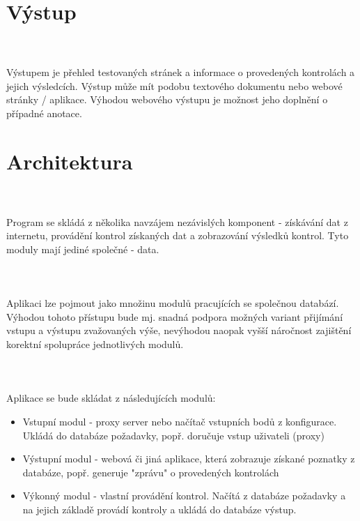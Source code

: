 \documentclass[10pt]{article}
\begin{document}
\section{V\'ystup}
\paragraph{~}V\'ystupem je p\v{r}ehled testovan\'ych str\'anek a informace o proveden\'ych kontrol\'ach a jejich v\'ysledc\'ich. V\'ystup m\r{u}\v{z}e m\'it podobu textov\'eho dokumentu nebo webov\'e str\'anky / aplikace. V\'yhodou webov\'eho v\'ystupu je mo\v{z}nost jeho dopln\v{e}n\'i o p\v{r}\'ipadn\'e anotace.

\section{Architektura}
\paragraph{~}Program se skl\'ad\'a z n\v{e}kolika navz\'ajem nez\'avisl\'ych komponent - z\'isk\'av\'an\'i dat z internetu, prov\'ad\v{e}n\'i kontrol z\'iskan\'ych dat a zobrazov\'an\'i v\'ysledk\r{u} kontrol. Tyto moduly maj\'i jedin\'e spole\v{c}n\'e - data.
\paragraph{~}Aplikaci lze pojmout jako mno\v{z}inu modul\r{u} pracuj\'ic\'ich se spole\v{c}nou datab\'az\'i. V\'yhodou tohoto p\v{r}\'istupu bude mj. snadn\'a podpora mo\v{z}n\'ych variant p\v{r}ij\'im\'an\'i vstupu a v\'ystupu zva\v{z}ovan\'ych v\'y\v{s}e, nev\'yhodou naopak vy\v{s}\v{s}\'i n\'aro\v{c}nost zaji\v{s}t\v{e}n\'i korektn\'i spolupr\'ace jednotliv\'ych modul\r{u}.
\paragraph{~}Aplikace se bude skl\'adat z n\'asleduj\'ic\'ich modul\r{u}:
\begin{itemize}
	\item Vstupn\'i modul - proxy server nebo na\v{c}\'ita\v{c} vstupn\'ich bod\r{u} z konfigurace. Ukl\'ad\'a do datab\'aze po\v{z}adavky, pop\v{r}. doru\v{c}uje vstup u\v{z}ivateli (proxy)
	\item V\'ystupn\'i modul - webov\'a \v{c}i jin\'a aplikace, kter\'a zobrazuje z\'iskan\'e poznatky z datab\'aze, pop\v{r}. generuje "zpr\'avu" o proveden\'ych kontrol\'ach
	\item V\'ykonn\'y modul - vlastn\'i prov\'ad\v{e}n\'i kontrol. Na\v{c}\'it\'a z datab\'aze po\v{z}adavky a na jejich z\'aklad\v{e} prov\'ad\'i kontroly a ukl\'ad\'a do datab\'aze v\'ystup.
\end{itemize}
\end{document}
